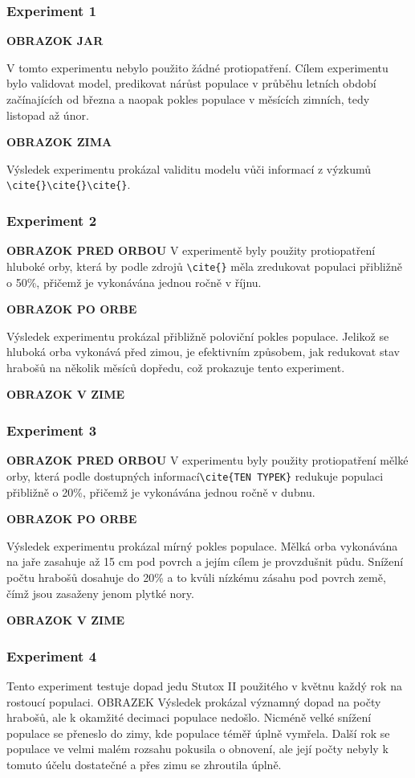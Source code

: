 \documentclass[a4paper,11pt]{article}
\begin{document}
\subsubsection{Experiment 1}
\textbf{OBRAZOK JAR}

V tomto experimentu nebylo použito žádné protiopatření. Cílem experimentu bylo validovat model, predikovat nárůst populace v průběhu letních období začínajících od března a naopak pokles populace v měsících zimních, tedy listopad až únor. 

\textbf{OBRAZOK ZIMA}

Výsledek experimentu prokázal validitu modelu vůči informací z výzkumů \verb|\cite{}|\verb|\cite{}|\verb|\cite{}|.
\subsubsection{Experiment 2}
\textbf{OBRAZOK PRED ORBOU}
V experimentě byly použity protiopatření hluboké orby, která by podle zdrojů \verb|\cite{}| měla zredukovat populaci přibližně o 50\%, přičemž je vykonávána jednou ročně v říjnu. 

\textbf{OBRAZOK PO ORBE}

Výsledek experimentu prokázal přibližně poloviční pokles populace. Jelikož se hluboká orba vykonává před zimou, je efektivním způsobem, jak redukovat stav hrabošů na několik měsíců dopředu, což prokazuje tento experiment.

\textbf{OBRAZOK V ZIME}

\subsubsection{Experiment 3}
\textbf{OBRAZOK PRED ORBOU}
V experimentu byly použity protiopatření mělké orby, která podle dostupných informací\verb|\cite{TEN TYPEK}| redukuje populaci přibližně o 20\%, přičemž je vykonávána jednou ročně v dubnu. 

\textbf{OBRAZOK PO ORBE}

Výsledek experimentu prokázal mírný pokles populace. Mělká orba vykonávána na jaře zasahuje až 15 cm pod povrch a jejím cílem je provzdušnit půdu. Snížení počtu hrabošů dosahuje do 20\% a to kvůli nízkému zásahu pod povrch země, čímž jsou zasaženy jenom plytké nory. 


\textbf{OBRAZOK V ZIME}
\subsubsection{Experiment 4}
Tento experiment testuje dopad jedu Stutox II použitého v květnu každý rok na rostoucí populaci.
OBRAZEK
Výsledek prokázal významný dopad na počty hrabošů, ale k okamžité decimaci populace nedošlo. Nicméně velké snížení populace se přeneslo do zimy, kde populace téměř úplně vymřela. Další rok se populace ve velmi malém rozsahu pokusila o obnovení, ale její počty nebyly k tomuto účelu dostatečné a přes zimu se zhroutila úplně.
\end{document}
